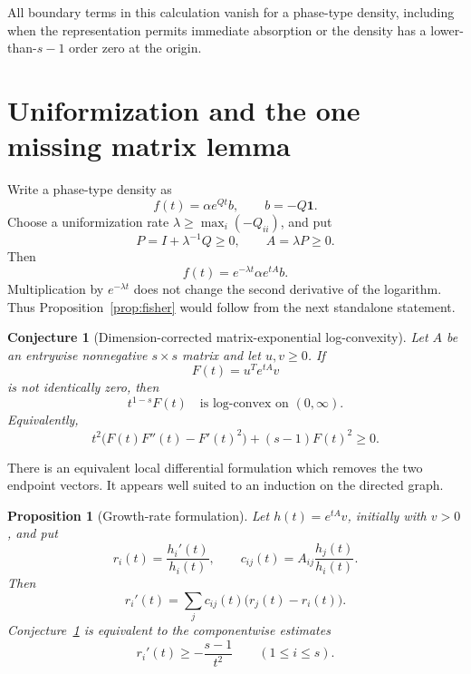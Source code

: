 \documentclass[11pt]{article}
\newtheorem{proposition}[theorem]{Proposition}
\newtheorem{conjecture}[theorem]{Conjecture}
\theoremstyle{remark}
\begin{document}
All boundary terms in this calculation vanish for a phase-type density,
including when the representation permits immediate absorption or the density
has a lower-than-\(s-1\) order zero at the origin.

\section{Uniformization and the one missing matrix lemma}

Write a phase-type density as
\[
  f(t)=\alpha e^{Qt}b,
  \qquad b=-Q\mathbf1.
\]
Choose a uniformization rate
\(\lambda\geq\max_i(-Q_{ii})\), and put
\[
  P=I+\lambda^{-1}Q\geq0,
  \qquad A=\lambda P\geq0.
\]
Then
\[
  f(t)=e^{-\lambda t}\alpha e^{tA}b.
\]
Multiplication by \(e^{-\lambda t}\) does not change the second derivative of
the logarithm.  Thus Proposition~\ref{prop:fisher} would follow from the next
standalone statement.

\begin{conjecture}[Dimension-corrected matrix-exponential log-convexity]
\label{conj:matrix}
Let \(A\) be an entrywise nonnegative \(s\times s\) matrix and let
\(u,v\geq0\).  If
\[
  F(t)=u^T e^{tA}v
\]
is not identically zero, then
\begin{equation}\label{eq:matrix-logconvex}
  t^{1-s}F(t)\quad\text{is log-convex on }(0,\infty).
\end{equation}
Equivalently,
\begin{equation}\label{eq:matrix-curvature}
  t^2\bigl(F(t)F''(t)-F'(t)^2\bigr)+(s-1)F(t)^2\geq0.
\end{equation}
\end{conjecture}

There is an equivalent local differential formulation which removes the two
endpoint vectors.  It appears well suited to an induction on the directed
graph.

\begin{proposition}[Growth-rate formulation]\label{prop:growth-rates}
Let $h(t)=e^{tA}v$, initially with $v>0$, and put
\[
 r_i(t)=\frac{h_i'(t)}{h_i(t)},\qquad
 c_{ij}(t)=A_{ij}\frac{h_j(t)}{h_i(t)}.
\]
Then
\begin{equation}\label{eq:rate-system}
 r_i'(t)=\sum_j c_{ij}(t)\bigl(r_j(t)-r_i(t)\bigr).
\end{equation}
Conjecture~\ref{conj:matrix} is equivalent to the componentwise estimates
\begin{equation}\label{eq:rate-target}
 r_i'(t)\geq-\frac{s-1}{t^2}
 \qquad(1\leq i\leq s).
\end{equation}
\end{proposition}
\end{document}
